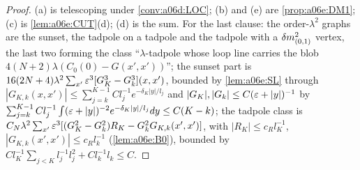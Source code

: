 \begin{proof}
(a) is telescoping under \cref{conv:a06d:LOC}; (b) and (e) are \cref{prop:a06e:DM1}; (c) is \cref{lem:a06e:CUT}(d); (d) is the sum. For the last clause: the order-$\lambda^2$ graphs are the sunset, the tadpole on a tadpole and the tadpole with a $\delta m^2_{(0,1)}$ vertex, the last two forming the class ``$\lambda$-tadpole whose loop line carries the blob $4(N+2)\lambda(C_0(0)-G(x',x'))$''; the sunset part is $16(2N+4)\lambda^2\sum_{x'}\varepsilon^3[G_K^3-G_k^3](x,x')$, bounded by \cref{lem:a06e:SL} through $|G_{K,k}(x,x')|\le\sum_{j=k}^{K-1}Cl_j^{-1}e^{-\delta_K|y|/l_j}$ and $|G_K|,|G_k|\le C(\varepsilon+|y|)^{-1}$ by $\sum_{j=k}^{K-1}Cl_j^{-1}\int(\varepsilon+|y|)^{-2}e^{-\delta_K|y|/l_j}dy\le C(K-k)$; the tadpole class is $C_N\lambda^2\sum_{x'}\varepsilon^3[(G_K^2-G_k^2)R_K-G_k^2G_{K,k}(x',x')]$, with $|R_K|\le c_Rl_K^{-1}$, $|G_{K,k}(x',x')|\le c_Rl_k^{-1}$ (\cref{lem:a06e:B0}), bounded by $Cl_K^{-1}\sum_{j<K}l_j^{-1}l_j^2+Cl_k^{-1}l_k\le C$.
\end{proof}

